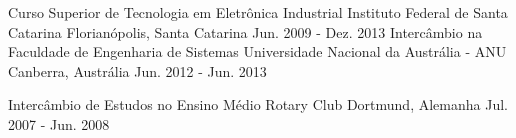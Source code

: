 

\begin{cventries}

  \cventry
    {Curso Superior de Tecnologia em Eletrônica Industrial} %
    {Instituto Federal de Santa Catarina} %
    {Florianópolis, Santa Catarina} %
    {Jun. 2009 - Dez. 2013} %
	   {} 
  \cventry
    {Intercâmbio na Faculdade de Engenharia de Sistemas} %
    {Universidade Nacional da Austrália - ANU} %
    {Canberra, Austrália} %
    {Jun. 2012 - Jun. 2013} %
    {}

 \cventry
    {Intercâmbio de Estudos no Ensino Médio} %
    {Rotary Club} %
    {Dortmund, Alemanha} %
    {Jul. 2007 - Jun. 2008} %
    {}


\end{cventries}
